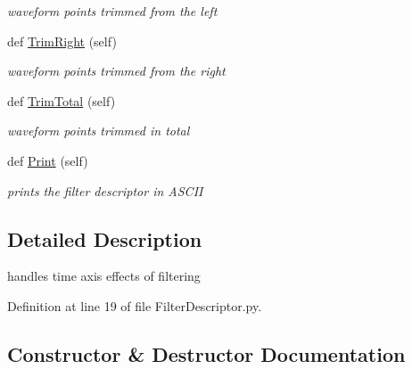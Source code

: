 \begin{DoxyCompactItemize}
\begin{DoxyCompactList}\small\item\em waveform points trimmed from the left \end{DoxyCompactList}\item 
def \hyperlink{classSignalIntegrity_1_1TimeDomain_1_1Filters_1_1FilterDescriptor_1_1FilterDescriptor_a284517d97da4a4e39890e41cbfa2a007}{Trim\+Right} (self)
\begin{DoxyCompactList}\small\item\em waveform points trimmed from the right \end{DoxyCompactList}\item 
def \hyperlink{classSignalIntegrity_1_1TimeDomain_1_1Filters_1_1FilterDescriptor_1_1FilterDescriptor_a8b3334081fe073524a4e0c068a61a3c6}{Trim\+Total} (self)
\begin{DoxyCompactList}\small\item\em waveform points trimmed in total \end{DoxyCompactList}\item 
\mbox{\label{classSignalIntegrity_1_1TimeDomain_1_1Filters_1_1FilterDescriptor_1_1FilterDescriptor_a0203fc9c617eec80ba28741251ee3b86}} 
def \hyperlink{classSignalIntegrity_1_1TimeDomain_1_1Filters_1_1FilterDescriptor_1_1FilterDescriptor_a0203fc9c617eec80ba28741251ee3b86}{Print} (self)
\begin{DoxyCompactList}\small\item\em prints the filter descriptor in A\+S\+C\+II \end{DoxyCompactList}\end{DoxyCompactItemize}


\subsection{Detailed Description}
handles time axis effects of filtering 

Definition at line 19 of file Filter\+Descriptor.\+py.



\subsection{Constructor \& Destructor Documentation}
\mbox{\label{classSignalIntegrity_1_1TimeDomain_1_1Filters_1_1FilterDescriptor_1_1FilterDescriptor_a5661d52c9fb7ff469d450299f14df811}} 
